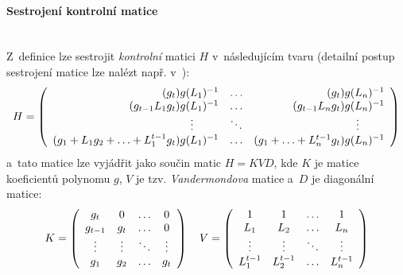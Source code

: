 \documentclass[thesis=M,czech,hidelinks]{FITthesis}[2012/06/26]
\newcommand{\0}{{\textcolor[gray]{0.75}{0}}}
\begin{document}
\paragraph{Sestrojení kontrolní matice} \hfil \\
Z~definice lze sestrojit \emph{kontrolní} matici $H$ v~následujícím tvaru
(detailní postup sestrojení matice lze nalézt např. v~\cite{Kotil}):
$$
    H = \left(\begin{array}{r c r}
        (           g_t) g(L_1)^{-1} & \ldots & (           g_t) g(L_n)^{-1} \\
        (g_{t-1}L_1 g_t) g(L_1)^{-1} & \ldots & (g_{t-1}L_n g_t) g(L_n)^{-1} \\
        \vdots \qquad \;             & \ddots & \vdots \qquad \;             \\
        (g_1 + L_1 g_2 + \ldots + L_1^{t-1} g_t) g(L_1)^{-1} &
            \ldots  &
            (g_1 + \ldots + L_n^{t-1} g_t) g(L_n)^{-1} \\
    \end{array}\right)
$$
a~tato matice lze vyjádřit jako součin matic $ H = KVD $, kde $K$ je matice
koeficientů polynomu $g$, $V$ je tzv.  \emph{Vandermondova} matice a~$D$ je
diagonální matice:
$$
    K = \left(\begin{array}{c c c c}
        g_t     & 0      & \ldots & 0      \\
        g_{t-1} & g_t    & \ldots & 0      \\
        \vdots  & \vdots & \ddots & \vdots \\
        g_1     & g_2    & \ldots & g_t    \\
    \end{array}\right)
    \quad
    V = \left(\begin{array}{c c c c}
        1         & 1         & \ldots & 1         \\
        L_1       & L_2       & \ldots & L_n       \\
        \vdots    & \vdots    & \ddots & \vdots    \\
        L_1^{t-1} & L_2^{t-1} & \ldots & L_n^{t-1} \\
    \end{array}\right)
$$
\end{document}
